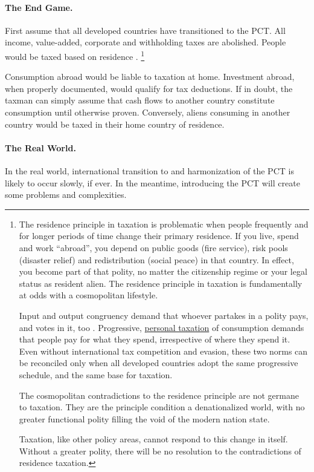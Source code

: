 \paragraph{The End Game.}
First assume that all developed countries have transitioned to the PCT.
All income, value-added, corporate and withholding taxes are abolished.
People would be taxed based on residence \citep[1645]{Graetz2009}.
\footnote{
	The residence principle in taxation is problematic when people frequently and for longer periods of time change their primary residence.
	If you live, spend and work ``abroad'', you depend on public goods (fire service), risk pools (disaster relief) and redistribution (social peace) in that country.
	In effect, you become part of that polity, no matter the citizenship regime or your legal status as resident alien.
	The residence principle in taxation is fundamentally at odds with a cosmopolitan lifestyle.

	Input and output congruency demand that whoever partakes in a polity pays, and votes in it, too \citep{Zurn-2000-aa}.
	Progressive, \hyperref[des:personal-taxation]{personal taxation} of consumption demands that people pay for what they spend, irrespective of where they spend it.
	Even without international tax competition and evasion, these two norms can be reconciled only when all developed countries adopt the same progressive schedule, and the same base for taxation.

	The cosmopolitan contradictions to the residence principle are not germane to taxation.
	They are the principle condition a denationalized world, with no greater functional polity filling the void of the modern nation state.

	Taxation, like other policy areas, cannot respond to this change in itself.
	Without a greater polity, there will be no resolution to the contradictions of residence taxation.
}

Consumption abroad would be liable to taxation at home.
Investment abroad, when properly documented, would qualify for tax deductions.
If in doubt, the taxman can simply assume that cash flows to another country constitute consumption until otherwise proven.
Conversely, aliens consuming in another country would be taxed in their home country of residence.

\paragraph{The Real World.}
In the real world, international transition to and harmonization of the PCT is likely to occur slowly, if ever.
In the meantime, introducing the PCT will create some problems and complexities.

